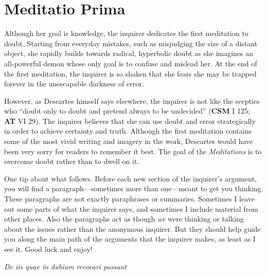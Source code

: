 \chapter{Meditatio Prima}


Although her goal is knowledge, the inquirer dedicates the first meditation to doubt. Starting from everyday mistakes, such as misjudging the size of a distant object, she rapidly builds towards radical, hyperbolic doubt as she imagines an all-powerful demon whose only goal is to confuse and mislead her. At the end of the first meditation, the inquirer is so shaken that she fears she may be trapped forever in the unescapable darkness of error.

However, as Descartes himself says elsewhere, the inquirer is not like the sceptics who ``doubt only to doubt and pretend always to be undecided'' (\textbf{CSM} I 125; \textbf{AT} VI 29). The inquirer believes that she can use doubt and error strategically in order to achieve certainty and truth. Although the first meditation contains some of the most vivid writing and imagery in the work, Descartes would have been very sorry for readers to remember it best. The goal of the \textit{Meditations} is to overcome doubt rather than to dwell on it.

One tip about what follows. Before each new section of the inquirer's argument, you will find a paragraph---sometimes more than one---meant to get you thinking. These paragraphs are not exactly paraphrases or summaries. Sometimes I leave out some parts of what the inquirer says, and sometimes I include material from other places. Also the paragraphs act as though \textit{we} were thinking or talking about the issues rather than the anonymous inquirer. But they should help guide you along the main path of the arguments that the inquirer makes, as least as I see it. Good luck and enjoy!

\clearpage

\begin{center}
    \beginnumbering
    \numberlinefalse
    \pstart
    \textit{De iis quae in dubium revocari possunt}
    \pend
    \endnumbering
\end{center}

